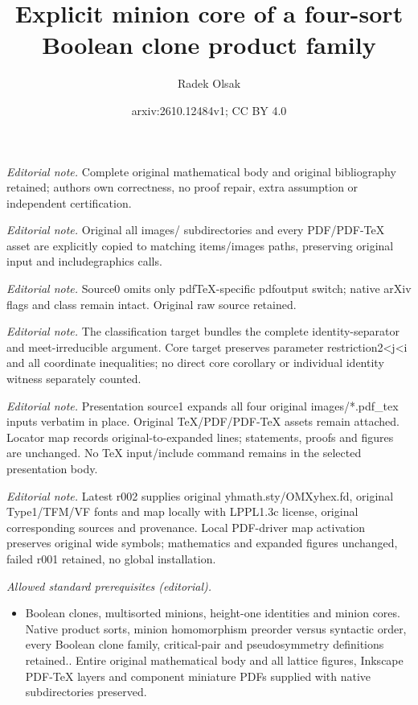 \documentclass{amsart}
\title{Explicit minion core of a four-sort Boolean clone product family}
\author{Radek Olsak}
\date{arxiv:2610.12484v1; CC BY 4.0}
\numberwithin{equation}{section}
\theoremstyle{plain}
\theoremstyle{definition}
\begin{document}
\maketitle
\noindent\textit{Editorial note.} Complete original mathematical body and original bibliography retained; authors own correctness, no proof repair, extra assumption or independent certification.\par\medskip
\noindent\textit{Editorial note.} Original all images/ subdirectories and every PDF/PDF-TeX asset are explicitly copied to matching items/images paths, preserving original input and includegraphics calls.\par\medskip
\noindent\textit{Editorial note.} Source0 omits only pdfTeX-specific pdfoutput switch; native arXiv flags and class remain intact. Original raw source retained.\par\medskip
\noindent\textit{Editorial note.} The classification target bundles the complete identity-separator and meet-irreducible argument. Core target preserves parameter restriction2<j<i and all coordinate inequalities; no direct core corollary or individual identity witness separately counted.\par\medskip
\noindent\textit{Editorial note.} Presentation source1 expands all four original images/*.pdf\_tex inputs verbatim in place. Original TeX/PDF/PDF-TeX assets remain attached. Locator map records original-to-expanded lines; statements, proofs and figures are unchanged. No TeX input/include command remains in the selected presentation body.\par\medskip
\noindent\textit{Editorial note.} Latest r002 supplies original yhmath.sty/OMXyhex.fd, original Type1/TFM/VF fonts and map locally with LPPL1.3c license, original corresponding sources and provenance. Local PDF-driver map activation preserves original wide symbols; mathematics and expanded figures unchanged, failed r001 retained, no global installation.\par\medskip
\noindent\textit{Allowed standard prerequisites (editorial).}\begin{itemize}
\item Boolean clones, multisorted minions, height-one identities and minion cores. Native product sorts, minion homomorphism preorder versus syntactic order, every Boolean clone family, critical-pair and pseudosymmetry definitions retained.. Entire original mathematical body and all lattice figures, Inkscape PDF-TeX layers and component miniature PDFs supplied with native subdirectories preserved.
\end{itemize}\medskip
\end{document}
